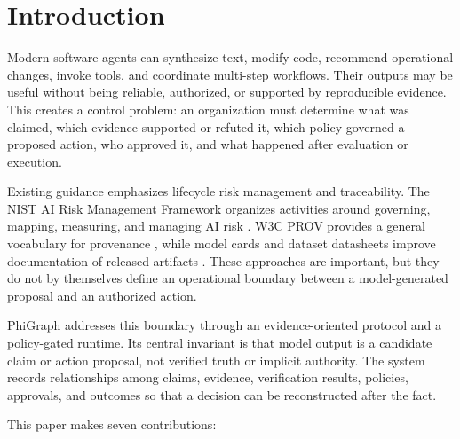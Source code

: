 \documentclass[11pt]{article}
\begin{document}
\section{Introduction}

Modern software agents can synthesize text, modify code, recommend operational
changes, invoke tools, and coordinate multi-step workflows. Their outputs may
be useful without being reliable, authorized, or supported by reproducible
evidence. This creates a control problem: an organization must determine what
was claimed, which evidence supported or refuted it, which policy governed a
proposed action, who approved it, and what happened after evaluation or
execution.

Existing guidance emphasizes lifecycle risk management and traceability.
The NIST AI Risk Management Framework organizes activities around governing,
mapping, measuring, and managing AI risk \cite{nist2023airmf}. W3C PROV provides
a general vocabulary for provenance \cite{lebo2013provo}, while model cards and
dataset datasheets improve documentation of released artifacts
\cite{mitchell2019modelcards,gebru2021datasheets}. These approaches are
important, but they do not by themselves define an operational boundary
between a model-generated proposal and an authorized action.

PhiGraph addresses this boundary through an evidence-oriented protocol and a
policy-gated runtime. Its central invariant is that model output is a candidate
claim or action proposal, not verified truth or implicit authority. The system
records relationships among claims, evidence, verification results, policies,
approvals, and outcomes so that a decision can be reconstructed after the
fact.

This paper makes seven contributions:
\end{document}
